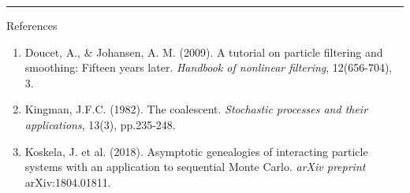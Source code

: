 \documentclass[final, 12pt]{beamer}
\newlength{\colwidth}
\begin{document}
\begin{frame}
\begin{columns}
\begin{column}{\colwidth}
\vspace*{50pt}

\hrule
\begin{block}{References}
\begin{enumerate}
\item Doucet, A., \& Johansen, A. M. (2009). A tutorial on particle filtering and smoothing: Fifteen years later. \textit{Handbook of nonlinear filtering}, 12(656-704), 3.
\item Kingman, J.F.C. (1982). The coalescent. \textit{Stochastic processes and their applications}, 13(3), pp.235-248.
\item Koskela, J. et al. (2018).  Asymptotic genealogies of interacting particle systems with an application to sequential Monte Carlo. \textit{arXiv preprint} arXiv:1804.01811.
\end{enumerate}
\end{block}

\end{column}
\end{columns}

\end{frame}
\end{document}
